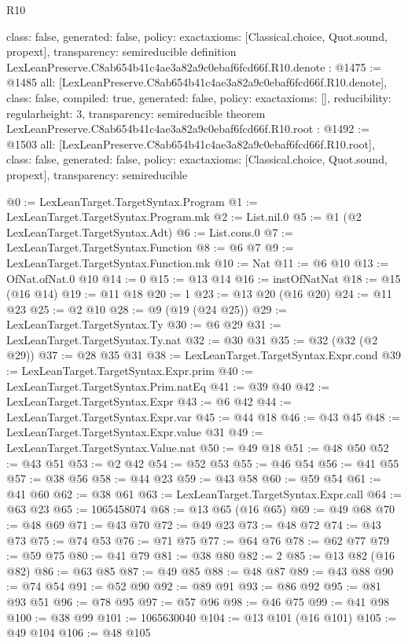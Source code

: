 \begin{lexlean}{R10}
\begin{coremodule}
{  class: false,
  generated: false,
  policy: exact{axioms: [Classical.choice, Quot.sound, propext]},
  transparency: semireducible
}
definition LexLeanPreserve.C8ab654b41c4ae3a82a9c0ebaf6fcd66f.R10.denote : @1475 := @1485 {
  all: [LexLeanPreserve.C8ab654b41c4ae3a82a9c0ebaf6fcd66f.R10.denote],
  class: false,
  compiled: true,
  generated: false,
  policy: exact{axioms: []},
  reducibility: regular{height: 3},
  transparency: semireducible
}
theorem LexLeanPreserve.C8ab654b41c4ae3a82a9c0ebaf6fcd66f.R10.root : @1492 := @1503 {
  all: [LexLeanPreserve.C8ab654b41c4ae3a82a9c0ebaf6fcd66f.R10.root],
  class: false,
  generated: false,
  policy: exact{axioms: [Classical.choice, Quot.sound, propext]},
  transparency: semireducible
}

@0 := LexLeanTarget.TargetSyntax.Program
@1 := LexLeanTarget.TargetSyntax.Program.mk
@2 := List.nil.{0}
@5 := @1 (@2 LexLeanTarget.TargetSyntax.Adt)
@6 := List.cons.{0}
@7 := LexLeanTarget.TargetSyntax.Function
@8 := @6 @7
@9 := LexLeanTarget.TargetSyntax.Function.mk
@10 := Nat
@11 := @6 @10
@13 := OfNat.ofNat.{0} @10
@14 := 0
@15 := @13 @14
@16 := instOfNatNat
@18 := @15 (@16 @14)
@19 := @11 @18
@20 := 1
@23 := @13 @20 (@16 @20)
@24 := @11 @23
@25 := @2 @10
@28 := @9 (@19 (@24 @25))
@29 := LexLeanTarget.TargetSyntax.Ty
@30 := @6 @29
@31 := LexLeanTarget.TargetSyntax.Ty.nat
@32 := @30 @31
@35 := @32 (@32 (@2 @29))
@37 := @28 @35 @31
@38 := LexLeanTarget.TargetSyntax.Expr.cond
@39 := LexLeanTarget.TargetSyntax.Expr.prim
@40 := LexLeanTarget.TargetSyntax.Prim.natEq
@41 := @39 @40
@42 := LexLeanTarget.TargetSyntax.Expr
@43 := @6 @42
@44 := LexLeanTarget.TargetSyntax.Expr.var
@45 := @44 @18
@46 := @43 @45
@48 := LexLeanTarget.TargetSyntax.Expr.value @31
@49 := LexLeanTarget.TargetSyntax.Value.nat
@50 := @49 @18
@51 := @48 @50
@52 := @43 @51
@53 := @2 @42
@54 := @52 @53
@55 := @46 @54
@56 := @41 @55
@57 := @38 @56
@58 := @44 @23
@59 := @43 @58
@60 := @59 @54
@61 := @41 @60
@62 := @38 @61
@63 := LexLeanTarget.TargetSyntax.Expr.call
@64 := @63 @23
@65 := 1065458074
@68 := @13 @65 (@16 @65)
@69 := @49 @68
@70 := @48 @69
@71 := @43 @70
@72 := @49 @23
@73 := @48 @72
@74 := @43 @73
@75 := @74 @53
@76 := @71 @75
@77 := @64 @76
@78 := @62 @77
@79 := @59 @75
@80 := @41 @79
@81 := @38 @80
@82 := 2
@85 := @13 @82 (@16 @82)
@86 := @63 @85
@87 := @49 @85
@88 := @48 @87
@89 := @43 @88
@90 := @74 @54
@91 := @52 @90
@92 := @89 @91
@93 := @86 @92
@95 := @81 @93 @51
@96 := @78 @95
@97 := @57 @96
@98 := @46 @75
@99 := @41 @98
@100 := @38 @99
@101 := 1065630040
@104 := @13 @101 (@16 @101)
@105 := @49 @104
@106 := @48 @105

\end{coremodule}
\end{lexlean}
